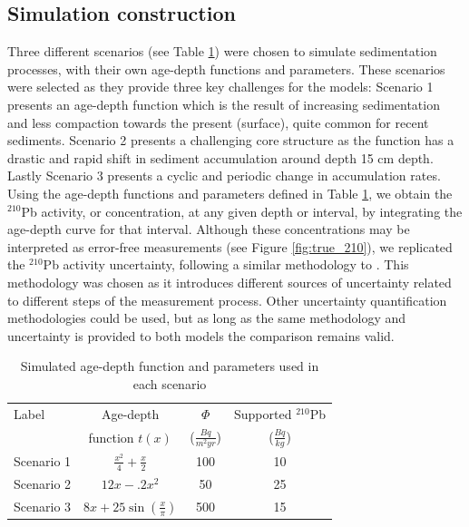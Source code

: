 \documentclass [10pt] {article}
\begin{document}
\subsection{Simulation construction}\label{sec:SimConst}

Three different scenarios (see Table \ref{tab:sim_param}) were chosen to simulate sedimentation processes, with their own age-depth functions and parameters. 
These scenarios were selected as they provide three key challenges for the models: 
Scenario 1 presents an age-depth function which is the result of increasing sedimentation and less compaction towards the present (surface), quite common for recent sediments. 
Scenario 2 presents a challenging core structure as the function has a drastic and rapid shift in sediment accumulation around depth 15 cm depth. Lastly Scenario 3 presents a cyclic and periodic change in accumulation rates. 
Using the age-depth functions and parameters defined in Table \ref{tab:sim_param}, we obtain the $^{210}$Pb activity, or concentration, at any given depth or interval, by integrating the age-depth curve for that interval.  
Although these concentrations may be interpreted as error-free measurements 
(see Figure \ref{fig:true_210}), we replicated the $^{210}$Pb activity uncertainty, following a similar methodology to \citet{Blaauw2018}.
This methodology was chosen as it introduces different sources of uncertainty related to different steps of the measurement process.
Other uncertainty quantification methodologies could be used, but as long as the same methodology and uncertainty is provided to both models the comparison remains valid.
\begin{table}[!h]
	\centering
	\begin{tabular}{l|ccc}
Label    	& 	Age-depth		&	$ \Phi$		& Supported $^{210}$Pb  \\
		&	function $t(x)$		&	($\frac{Bq}{m^2yr }$)	& ($\frac{Bq}{kg}$) 	\\ \hline
Scenario 1 	&	$\frac{x^2}{4} + \frac{x}{2}$	&	100	& 10	\\
Scenario 2 	&	$12x -.2x^2$			&	50	& 25	\\
Scenario 3 	&	$8x+25\sin(\frac{x}{\pi})$	&	500 	& 15		
	\end{tabular}
	\label{tab:sim_param}
	\caption{Simulated age-depth function and parameters used in each scenario}
 \end{table}
\end{document}
